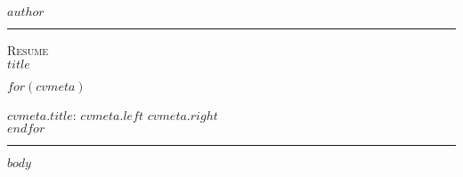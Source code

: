 \documentclass[10pt,A4]{article}
\newcommand{\metasection}[2]
{
\footnotesize{#2} \hspace*{\fill} \footnotesize{#1}\\[1pt]
}
\newcommand{\mystrut}{\rule[-.3\baselineskip]{0pt}{\baselineskip}}
\begin{document}
\pagestyle{fancy}

\vspace{-8pt}
\begin{center}
	\HUGE \textsc{$author$} \textcolor{sectcol}{\rule[-1mm]{1mm}{0.9cm}} \textsc{Resume}\\[2pt]
	\small $title$
\end{center}

\vspace{6pt}

$for(cvmeta)$
\metasection{$cvmeta.right$}{\textbf{$cvmeta.title$}: $cvmeta.left$}
$endfor$

\vspace{-2pt}
\textcolor{softcol}{\hrule}
\vspace{6pt}

\normalsize

\vspace{-6pt}
$body$


\null
\vspace*{\fill}
\hspace{-0.25\linewidth}\colorbox{white}{\makebox[1.5\linewidth][c]{\mystrut  \textnormal{\textcolor{sectcol}{$cvfooter.left$}  *  \textcolor{sectcol}{$cvfooter.right$}}}}
\end{document}
